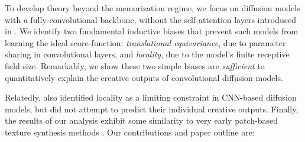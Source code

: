 \documentclass{article}
\theoremstyle{plain}
\theoremstyle{definition}
\theoremstyle{remark}
\begin{document}
To develop theory beyond the memorization regime, we focus on diffusion models with a fully-convolutional backbone, without the self-attention layers introduced in \cite{ho2020denoising}.  We identify two fundamental inductive biases that prevent such models from learning the ideal score-function:  \textit{translational equivariance}, due to parameter sharing in convolutional layers, and \textit{locality}, due to the model's finite receptive field size. Remarkably, we show these two simple biases are {\it sufficient} to quantitatively explain the creative outputs of convolutional diffusion models. 

Relatedly, \cite{kadkhodaie2023learning} also identified locality as a limiting constraint in CNN-based diffusion models, but did not attempt to predict their individual creative outputs. Finally, the results of our analysis exhibit some similarity to very early patch-based texture synthesis methods \cite{efros1999texture}. Our contributions and paper outline are:
\end{document}
